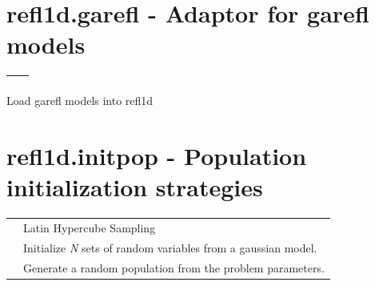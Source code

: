 \documentclass[letterpaper,10pt,english]{sphinxmanual}
\begin{document}

\begin{fulllineitems}
\label{api/fresnel:refl1d.fresnel.test}
\end{fulllineitems}



\section{refl1d.garefl - Adaptor for garefl models}
\label{api/garefl:refl1d-garefl-adaptor-for-garefl-models}\label{api/garefl::doc}
\begin{tabulary}{\linewidth}{LL}
\hline

{\hyperref[api/garefl:refl1d.garefl.load]{}}
 & 

\\
\hline
\end{tabulary}

\label{api/garefl:module-refl1d.garefl}
Load garefl models into refl1d

\begin{fulllineitems}
\label{api/garefl:refl1d.garefl.load}
\end{fulllineitems}



\section{refl1d.initpop - Population initialization strategies}
\label{api/initpop:refl1d-initpop-population-initialization-strategies}\label{api/initpop::doc}
\begin{tabulary}{\linewidth}{LL}
\hline

{\hyperref[api/initpop:refl1d.initpop.lhs_init]{}}
 & 
Latin Hypercube Sampling
\\

{\hyperref[api/initpop:refl1d.initpop.cov_init]{}}
 & 
Initialize \emph{N} sets of random variables from a gaussian model.
\\

{\hyperref[api/initpop:refl1d.initpop.random_init]{}}
 & 
Generate a random population from the problem parameters.
\\
\hline
\end{tabulary}
\end{document}
